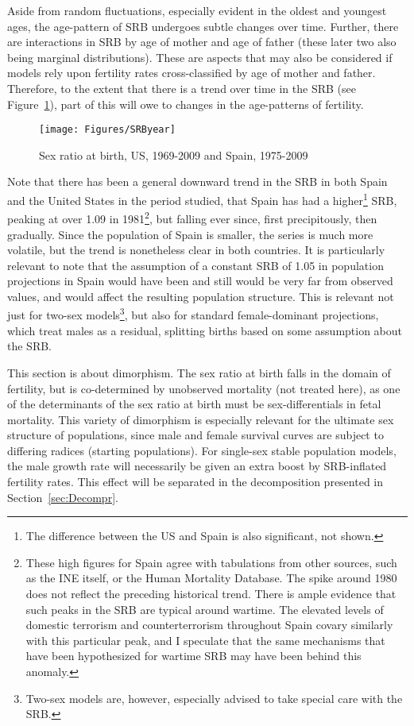 Aside from random fluctuations, especially evident in the oldest and youngest
ages, the age-pattern of SRB undergoes subtle changes over time. Further, there
are interactions in SRB by age of mother and age of father (these later two
also being marginal distributions). These are aspects that may also be
considered if models rely upon fertility rates cross-classified by age of mother
and father. Therefore, to the extent that there is a trend over time in the SRB
(see Figure~\ref{fig:SRByears}), part of this will owe to changes in the
age-patterns of fertility.

\begin{figure}[ht!]
        \centering  
          \caption{Sex ratio at birth, US, 1969-2009 and Spain,
          1975-2009}
           \texttt{[image: Figures/SRByear]}
          \label{fig:SRByears}
\end{figure}

Note that there has been a general downward trend in the SRB in both Spain and
the United States in the period studied, that Spain has had a
higher\footnote{The difference between the US and Spain is also significant, not
shown.} SRB, peaking at over 1.09 in 1981\footnote{These high figures for
Spain agree with tabulations from other sources, such as the INE itself, or the
Human Mortality Database. The spike around 1980 does not reflect the
preceding historical trend. There is ample evidence that such peaks in the SRB
are typical around wartime\citep{james2009variations}. The elevated levels of
domestic terrorism and counterterrorism throughout Spain covary similarly with
this particular peak, and I speculate that the same mechanisms
that have been hypothesized for wartime SRB may have been behind this anomaly.}, but falling ever since,
first precipitously, then gradually. Since the population of Spain is smaller, the series 
is much more volatile, but the trend is nonetheless clear in both countries. It 
is particularly relevant to note that the assumption of a constant SRB of 1.05 in
 population projections in Spain would have been and still would be very far from 
 observed values, and would affect the resulting population structure. This is 
 relevant not just for two-sex models\footnote{Two-sex models are, however, especially 
 advised to take special care with the SRB.}, but also for standard female-dominant 
 projections, which treat males as a residual, splitting births based on some
assumption about the SRB.

This section is about dimorphism. The sex ratio at birth
falls in the domain of fertility, but is co-determined by unobserved mortality
(not treated here), as one of the determinants of the sex ratio at birth must be
sex-differentials in fetal mortality\citep{hassold1983sex}. This variety of
dimorphism is especially relevant for the ultimate sex structure of populations, since male and female survival curves are subject 
to differing radices (starting populations). For single-sex stable population
models, the male growth rate will necessarily be given an extra boost by SRB-inflated fertility
rates. This effect will be separated in the decomposition presented in
Section~\ref{sec:Decompr}.
